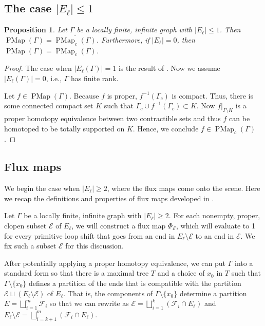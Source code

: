 \documentclass[11pt]{amsart}
\theoremstyle{plain}
\newtheorem{PROP}[THM]{Proposition}
\theoremstyle{definition}
\DeclareMathOperator{\PMap}{PMap}
\newcommand{\cE}{\mathcal{E}}
\newcommand{\cF}{\mathcal{F}}
\def\G{{\Gamma}}
\newcommand{\<}{\langle}
\renewcommand{\>}{\rangle}
\begin{document}
\subsection{The case $|E_\ell| \le 1$} \label{ssec:atmostOneEnd}
\begin{PROP} \label{prop:noloopends}
    Let $\G$ be a locally finite, infinite graph with $|E_\ell| \le 1$. Then $\PMap(\G) = \overline{\PMap_c(\G)}$. Furthermore, if $\lvert E_{\ell} \rvert =0$, then $\PMap(\G)=\PMap_c(\G)$.
\end{PROP}

\begin{proof}
    The case when $|E_\ell(\G)|=1$ is the result of \cite[Corollary 4.5]{DHK2023}. Now we assume $|E_\ell(\G)|=0$, i.e., $\G$ has finite rank. 
    
    Let $f \in \PMap(\G)$. Because $f$ is proper, $f^{-1}(\G_{c})$ is compact. Thus, there is some connected compact set $K$ such that $\G_{c} \cup f^{-1}(\G_{c}) \subset K$. Now $f\vert_{\G \setminus K}$ is a proper homotopy equivalence between two contractible sets and thus $f$ can be homotoped to be totally supported on $K$. Hence, we conclude $f \in \PMap_{c}(\G)$.
\end{proof} 


\subsection{Flux maps}\label{ssec:fluxmaps}
 We begin the case when $|E_\ell| \ge 2$, where the flux maps come onto the scene.
Here we recap the definitions and properties of flux maps developed in \cite[Section 7]{DHK2023}.

Let $\G$ be a locally finite, infinite graph with $|E_\ell| \ge 2$. For each nonempty, proper, clopen subset $\cE$ of $E_\ell$, we will construct a flux map $\Phi_\cE$, which will evaluate to 1 for every primitive loop shift that goes from an end in $E_\ell \setminus \cE$ to an end in $\cE$. We fix such a subset $\cE$ for this discussion.


After potentially applying a proper homotopy equivalence, we can put $\G$ into a standard form so that there is a maximal tree $T$ and a choice of $x_0$ in $T$ such that $\G \setminus \{x_0\}$ defines a partition of the ends that is compatible with the partition $\cE \sqcup (E_\ell \setminus \cE)$ of $E_\ell$. That is, the components of $\G \setminus \{x_{0}\}$ determine a partition $E = \bigsqcup_{i=1}^{m} \cF_{i}$ so that we can rewrite as $\cE = \bigsqcup_{i=1}^{k} (\cF_{i} \cap  E_{\ell})$ and $E_{\ell} \setminus \cE = \bigsqcup_{i=k+1}^{m} (\cF_i \cap E_{\ell})$.
\end{document}
